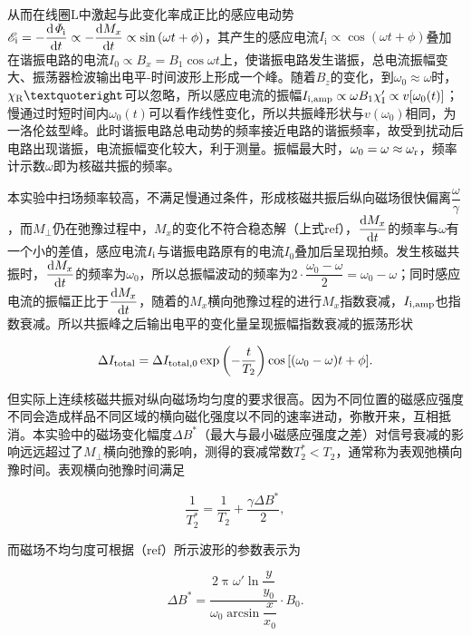 从而在线圈\(\mathrm{L}\)中激起与此变化率成正比的感应电动势\(\mathscr{E}_{\mathrm{i}}=-\dfrac{\mathrm{d}\mathit{\Phi}_{\mathrm{i}}}{{\rm d}t}\propto-\dfrac{\mathrm{d}M_x}{{\rm d}t}\propto \sin{(\omega t+\phi)}\)，其产生的感应电流\(I_{\mathrm{i}}\propto \cos{(\omega t+\phi)}\)叠加在谐振电路的电流\(I_0\propto B_x=B_1\cos{\omega t}\)上，使谐振电路发生谐振，总电流振幅变大、振荡器检波输出电平-时间波形上形成一个峰。随着\(B_z\)的变化，到\(\omega_0\approx\omega\)时，\(\chi_{\rm R}’\)可以忽略，所以感应电流的振幅\(I_{\rm i,amp}\propto\omega B_1\chi'_{\rm I}\propto v[\omega_0(t)]\)；慢通过时短时间内\(\omega_0(t)\)可以看作线性变化，所以共振峰形状与\(v(\omega_0)\)相同，为一洛伦兹型峰。此时谐振电路总电动势的频率接近电路的谐振频率，故受到扰动后电路出现谐振，电流振幅变化较大，利于测量。振幅最大时，\(\omega_0=\omega\approx\omega_{\rm r}\)，频率计示数\(\omega\)即为核磁共振的频率。

本实验中扫场频率较高，不满足慢通过条件，形成核磁共振后纵向磁场很快偏离\(\dfrac{\omega}{\gamma}\)，而\(M_{\perp}\)仍在弛豫过程中，\(M_x\)的变化不符合稳态解（上式ref），\(\dfrac{{\rm d}M_x}{{\rm d}t}\)的频率与\(\omega\)有一个小的差值，感应电流\(I_{\rm i}\)与谐振电路原有的电流\(I_0\)叠加后呈现拍频。发生核磁共振时，\(\dfrac{{\rm d}M_x}{{\rm d}t}\)的频率为\(\omega_0\)，所以总振幅波动的频率为\(2\cdot\dfrac{\omega_0-\omega}{2}=\omega_0-\omega\)；同时感应电流的振幅正比于\(\dfrac{{\rm d}M_x}{{\rm d}t}\)，随着的\(M_x\)横向弛豫过程的进行\(M_x\)指数衰减，\(I_{\rm i,amp}\)也指数衰减。所以共振峰之后输出电平的变化量呈现振幅指数衰减的振荡形状

\begin{equation}
\Delta I_{\rm total}=\Delta I_{\rm total,0}\exp{\left(-\dfrac{t}{T_2}\right)}\cos{\left[(\omega_0-\omega)t+\phi\right]}.
\end{equation}

但实际上连续核磁共振对纵向磁场均匀度的要求很高。因为不同位置的磁感应强度不同会造成样品不同区域的横向磁化强度以不同的速率进动，弥散开来，互相抵消。本实验中的磁场变化幅度\(\Delta B^*\)（最大与最小磁感应强度之差）对信号衰减的影响远远超过了\(M_{\perp}\)横向弛豫的影响，测得的衰减常数\(T_2^*<T_2\)，通常称为表观弛横向豫时间。表观横向弛豫时间满足

\begin{equation}
\dfrac{1}{T_2^*}=\dfrac{1}{T_2}+\dfrac{\gamma \Delta B^*}{2},
\end{equation}

而磁场不均匀度可根据（ref）所示波形的参数表示为

\begin{equation}
\Delta B^* = \dfrac{2\uppi\omega'\ln{\dfrac{y}{y_0}}}{\omega_0\arcsin{\dfrac{x}{x_0}}}\cdot B_0.
\end{equation}

